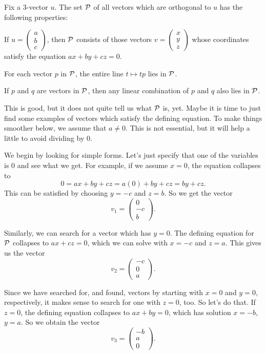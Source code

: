 \documentclass[00-livre-main.tex]{subfiles}
\begin{document}
\begin{theorem}\label{thm:plane-properties}
Fix a $3$-vector $u$. The set $\mathcal{P}$ of all vectors which are orthogonal to $u$ has the following properties:
\begin{compactitem}
\item If $u = \left(\begin{smallmatrix}a\\b\\c\end{smallmatrix}\right)$, then $\mathcal{P}$ consists of those vectors $v = \left(\begin{smallmatrix}x\\y\\z\end{smallmatrix}\right)$ whose coordinates satisfy the equation $ax+by+cz=0$.
\item For each vector $p$ in $\mathcal{P}$, the entire line $t \mapsto tp$ lies in $\mathcal{P}$.
\item If $p$ and $q$ are vectors in $\mathcal{P}$, then any linear combination of $p$ and $q$ also lies in $\mathcal{P}$.
\end{compactitem}
\end{theorem}

This is good, but it does not quite tell us what $\mathcal{P}$ is, yet. Maybe it is time to just find some examples of vectors which satisfy the defining equation. 
To make things smoother below, we assume that $a\neq 0$. This is not essential, but it will help a little to avoid dividing by $0$.

We begin by looking for simple forms. Let's just specify that one of the variables is $0$ and see what we get. For example, if we assume $x=0$, the equation collapses to
\[
0 = ax+by+cz = a(0) + by + cz = by+cz.
\]
This can be satisfied by choosing $y=-c$ and $z=b$. So we get the vector 
\[
v_1 = \begin{pmatrix} 0 \\ -c \\ b \end{pmatrix}.
\]

Similarly, we can search for a vector which has $y=0$. The defining equation for $\mathcal{P}$ collapses to $ax+cz=0$, which we can solve with $x=-c$ and $z=a$. This gives us the vector
\[
v_2 = \begin{pmatrix} -c \\ 0 \\ a \end{pmatrix}.
\]

Since we have searched for, and found, vectors by starting with $x=0$ and $y=0$, respectively, it makes sense to search for one with $z=0$, too. So let's do that. If $z=0$, the defining equation collapses to $ax+by=0$, which has solution $x=-b$, $y=a$. So we obtain the vector
\[
v_3 = \begin{pmatrix} -b \\ a \\ 0 \end{pmatrix}.
\]
\end{document}
